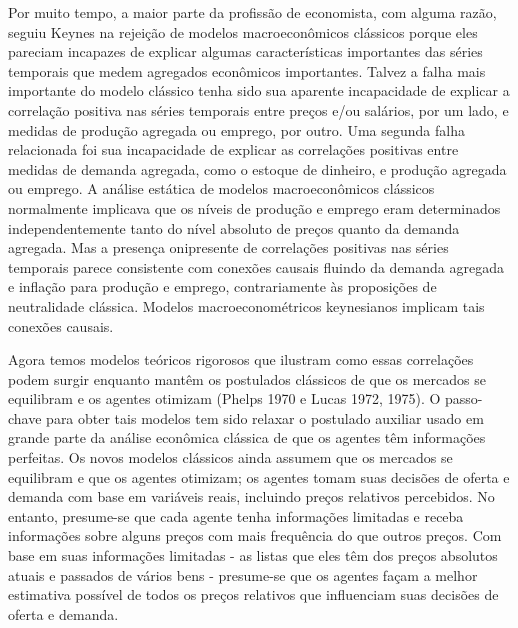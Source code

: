 \documentclass[12pt]{article}
\begin{document}
Por muito tempo, a maior parte da profissão de economista, com alguma razão, seguiu Keynes na rejeição de modelos macroeconômicos clássicos porque eles pareciam incapazes de explicar algumas características importantes das séries temporais que medem agregados econômicos importantes. Talvez a falha mais importante do modelo clássico tenha sido sua aparente incapacidade de explicar a correlação positiva nas séries temporais entre preços e/ou salários, por um lado, e medidas de produção agregada ou emprego, por outro. Uma segunda falha relacionada foi sua incapacidade de explicar as correlações positivas entre medidas de demanda agregada, como o estoque de dinheiro, e produção agregada ou emprego. A análise estática de modelos macroeconômicos clássicos normalmente implicava que os níveis de produção e emprego eram determinados independentemente tanto do nível absoluto de preços quanto da demanda agregada. Mas a presença onipresente de correlações positivas nas séries temporais parece consistente com conexões causais fluindo da demanda agregada e inflação para produção e emprego, contrariamente às proposições de neutralidade clássica. Modelos macroeconométricos keynesianos implicam tais conexões causais.

Agora temos modelos teóricos rigorosos que ilustram como essas correlações podem surgir enquanto mantêm os postulados clássicos de que os mercados se equilibram e os agentes otimizam (Phelps 1970 e Lucas 1972, 1975). O passo-chave para obter tais modelos tem sido relaxar o postulado auxiliar usado em grande parte da análise econômica clássica de que os agentes têm informações perfeitas. Os novos modelos clássicos ainda assumem que os mercados se equilibram e que os agentes otimizam; os agentes tomam suas decisões de oferta e demanda com base em variáveis reais, incluindo preços relativos percebidos. No entanto, presume-se que cada agente tenha informações limitadas e receba informações sobre alguns preços com mais frequência do que outros preços. Com base em suas informações limitadas - as listas que eles têm dos preços absolutos atuais e passados de vários bens - presume-se que os agentes façam a melhor estimativa possível de todos os preços relativos que influenciam suas decisões de oferta e demanda.
\end{document}
